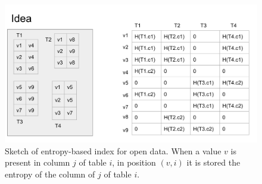\begin{figure}[t]\label{index_sketch}
    \includegraphics[scale=0.4]{figures/index_sketch.png}
    \caption{Sketch of entropy-based index for open data. When a value $v$ is present in column $j$ of table $i$, in position $(v,i)$ it is stored the entropy of the column of $j$ of table $i$.}
\end{figure}

